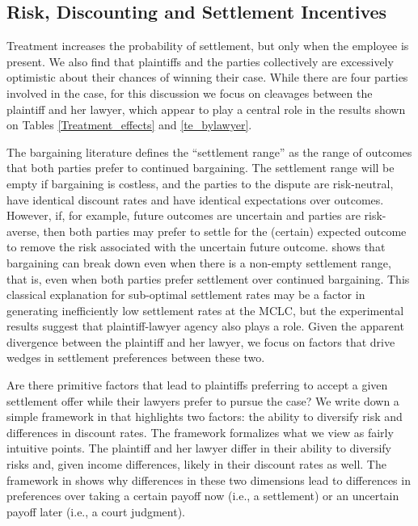 \documentclass[11pt, a4paper]{article}
\begin{document}
\subsection{Risk, Discounting and Settlement Incentives}

Treatment increases the probability of settlement, but only when the employee is present. We also find that plaintiffs and the parties collectively are excessively optimistic about their chances of winning their case. While there are four parties involved in the case, for this discussion we focus on cleavages between the plaintiff and her lawyer, which appear to play a central role in the results shown on Tables \ref{Treatment_effects} and \ref{te_bylawyer}.

The bargaining literature defines the ``settlement range'' as the range of outcomes that both parties prefer to continued bargaining. The settlement range will be empty if bargaining is costless, and the parties to the dispute are risk-neutral, have identical discount rates and have identical expectations over outcomes. However, if, for example, future outcomes are uncertain and parties are risk-averse, then both parties may prefer to settle for the (certain) expected outcome to remove the risk associated with the uncertain future outcome. \cite{myerson} shows that bargaining can break down even when there is a non-empty settlement range, that is, even when both parties prefer settlement over continued bargaining. This classical explanation for sub-optimal settlement rates may be a factor in generating inefficiently low settlement rates at the MCLC, but the experimental results suggest that plaintiff-lawyer agency also plays a role. Given the apparent divergence between the plaintiff and her lawyer, we focus on factors that drive wedges in settlement preferences between these two. 

Are there primitive factors that lead to plaintiffs preferring to accept a given settlement offer while their lawyers prefer to pursue the case? We write down a simple framework in  that highlights two factors: the ability to diversify risk and differences in discount rates. The framework formalizes what we view as fairly intuitive points. The plaintiff and her lawyer differ in their ability to diversify risks and, given income differences, likely in their discount rates as well. The framework in  shows why differences in these two dimensions lead to differences in preferences over taking a certain payoff now (i.e., a settlement) or an uncertain payoff later (i.e., a court judgment). 
\end{document}
